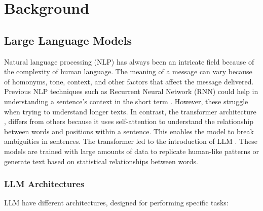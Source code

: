 

\section{Background}

\subsection{Large Language Models}
Natural language processing (NLP) has always been an intricate field because of the complexity of human language. The meaning of a message can vary because of homonyms, tone, context, and other factors that affect the message delivered. %
Previous NLP techniques such as Recurrent Neural Network (RNN) could help in understanding a sentence's context in the short term \cite{Sherstinsky_2020}. However, these struggle when trying to understand longer texts. In contrast, the  transformer architecture \cite{vaswani2023attentionneed}, differs from others because it uses self-attention to understand the relationship between words and positions within a sentence. This enables the model to break ambiguities in sentences. The transformer led to the introduction of LLM \cite{naveed2024comprehensiveoverviewlargelanguage}. These models are trained with large amounts of data to replicate human-like patterns or generate text based on statistical relationships between words.

%

\subsubsection{LLM Architectures}
LLM have different architectures, designed for performing specific tasks:

